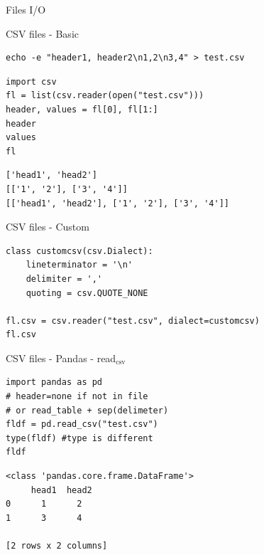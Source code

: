 \documentclass[presentation]{beamer}
\begin{document}
\begin{frame}[label=sec-4-1-20]{Files I/O}
\end{frame}

\begin{frame}[fragile,label=sec-4-1-21]{CSV files - Basic}
 \lstset{numbers=left,language=sh,label= ,caption= }
\begin{lstlisting}
echo -e "header1, header2\n1,2\n3,4" > test.csv
\end{lstlisting}
\lstset{numbers=left,language=Python,label= ,caption= }
\begin{lstlisting}
import csv
fl = list(csv.reader(open("test.csv")))
header, values = fl[0], fl[1:]
header
values
fl
\end{lstlisting}

\lstset{numbers=left,language=Python,label= ,caption= }
\begin{lstlisting}
['head1', 'head2']
[['1', '2'], ['3', '4']]
[['head1', 'head2'], ['1', '2'], ['3', '4']]
\end{lstlisting}
\end{frame}

\begin{frame}[fragile,label=sec-4-1-22]{CSV files - Custom}
 \lstset{numbers=left,language=Python,label= ,caption= }
\begin{lstlisting}
class customcsv(csv.Dialect):
    lineterminator = '\n'
    delimiter = ','
    quoting = csv.QUOTE_NONE

fl.csv = csv.reader("test.csv", dialect=customcsv)
fl.csv
\end{lstlisting}
\end{frame}

\begin{frame}[fragile,label=sec-4-1-23]{CSV files - Pandas - read$_{\text{csv}}$}
 \lstset{numbers=left,language=Python,label= ,caption= }
\begin{lstlisting}
import pandas as pd
# header=none if not in file
# or read_table + sep(delimeter)
fldf = pd.read_csv("test.csv")
type(fldf) #type is different
fldf
\end{lstlisting}

\lstset{numbers=left,language=Python,label= ,caption= }
\begin{lstlisting}
<class 'pandas.core.frame.DataFrame'>
     head1  head2
0      1      2
1      3      4

[2 rows x 2 columns]
\end{lstlisting}
\end{frame}
\end{document}
